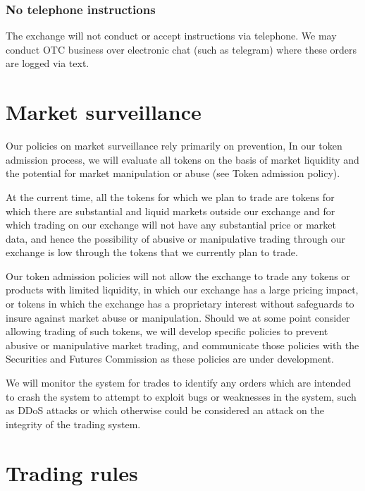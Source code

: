 \subsubsection{No telephone instructions}
The exchange will not conduct or accept instructions via telephone.
We may conduct OTC business over electronic chat (such as telegram) where
these orders are logged via text.

\section{Market surveillance}

Our policies on market surveillance rely primarily on prevention, In
our token admission process, we will evaluate all tokens on the basis
of market liquidity and the potential for market manipulation or abuse
(see Token admission policy).

At the current time, all the tokens for which we plan to trade are
tokens for which there are substantial and liquid markets outside
our exchange and for which trading on our exchange will not have any
substantial price or market data, and hence the possibility of abusive
or manipulative trading through our exchange is low through the tokens
that we currently plan to trade.

Our token admission policies will not allow the exchange to trade any
tokens or products with limited liquidity, in which our exchange has a
large pricing impact, or tokens in which the exchange has a
proprietary interest without safeguards to insure against market abuse
or manipulation.  Should we at some point consider allowing trading of
such tokens, we will develop specific policies to prevent abusive or
manipulative market trading, and communicate those policies with the
Securities and Futures Commission as these policies are under
development.

We will monitor the system for trades to identify any orders which are
intended to crash the system to attempt to exploit bugs or weaknesses
in the system, such as DDoS attacks or which otherwise could be considered an
attack on the integrity of the trading system.

\section{Trading rules}

